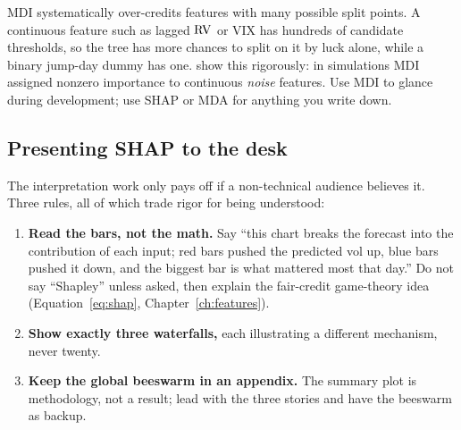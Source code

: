 \begin{warning}
MDI systematically over-credits features with many possible split points.
A continuous feature such as lagged $\operatorname{RV}$ or VIX has hundreds of candidate
thresholds, so the tree has more chances to split on it by luck alone, while
a binary jump-day dummy has one.  \citet{StroblBoulesteixZeileisHothorn2007}
show this rigorously: in simulations MDI assigned nonzero importance to
continuous \emph{noise} features.  Use MDI to glance during development; use
SHAP or MDA for anything you write down.
\end{warning}

\subsection{Presenting SHAP to the desk}

The interpretation work only pays off if a non-technical audience believes
it.  Three rules, all of which trade rigor for being understood:

\begin{enumerate}[leftmargin=1.8em]
\item \textbf{Read the bars, not the math.}  Say ``this chart breaks the
  forecast into the contribution of each input; red bars pushed the
  predicted vol up, blue bars pushed it down, and the biggest bar is what
  mattered most that day.''  Do not say ``Shapley'' unless asked, then
  explain the fair-credit game-theory idea
  (Equation~\ref{eq:shap}, Chapter~\ref{ch:features}).
\item \textbf{Show exactly three waterfalls,} each illustrating a different
  mechanism, never twenty.
\item \textbf{Keep the global beeswarm in an appendix.}  The summary plot is
  methodology, not a result; lead with the three stories and have the
  beeswarm as backup.
\end{enumerate}

